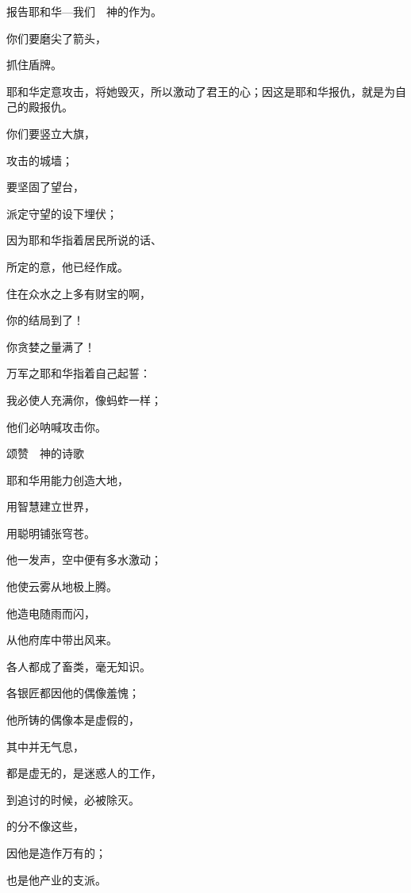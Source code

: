 {\par }{\Q 报告耶和华—我们　神的作为。
\par }{\BB \par }{\Q {}你们要磨尖了箭头，
\par }{\Q 抓住盾牌。
\par }{\MM 耶和华定意攻击{}，将她毁灭，所以激动了{}君王的心；因这是耶和华报仇，就是为自己的殿报仇。
\par }{\Q {}你们要竖立大旗，
\par }{\Q 攻击{}的城墙；
\par }{\Q 要坚固了望台，
\par }{\Q 派定守望的设下埋伏；
\par }{\Q 因为耶和华指着{}居民所说的话、
\par }{\Q 所定的意，他已经作成。
\par }{\Q {}住在众水之上多有财宝的啊，
\par }{\Q 你的结局到了！
\par }{\Q 你贪婪之量满了！
\par }{\Q {}万军之耶和华指着自己起誓{}：
\par }{\Q 我必使{}人充满你，像蚂蚱一样；
\par }{\Q 他们必呐喊攻击你。
\par }{\SH 颂赞　神的诗歌
\par }{\Q {}耶和华用能力创造大地，
\par }{\Q 用智慧建立世界，
\par }{\Q 用聪明铺张穹苍。
\par }{\Q {}他一发声，空中便有多水激动；
\par }{\Q 他使云雾从地极上腾。
\par }{\Q 他造电随雨而闪，
\par }{\Q 从他府库中带出风来。
\par }{\Q {}各人都成了畜类，毫无知识。
\par }{\Q 各银匠都因他的偶像羞愧；
\par }{\Q 他所铸的偶像本是虚假的，
\par }{\Q 其中并无气息，
\par }{\Q {}都是虚无的，是迷惑人的工作，
\par }{\Q 到追讨的时候，必被除灭。
\par }{\Q {}的分不像这些，
\par }{\Q 因他是造作万有的{}；
\par }{也是他产业的支派。
}
